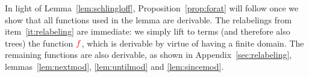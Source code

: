 In light of Lemma~\ref{lem:schlingloff},  Proposition~\ref{prop:forat} will follow once we  show that all functions  used in the lemma are derivable. The relabelings from item~\ref{it:relabeling} are immediate: we simply lift to terms (and therefore also trees) the function ${\color{red}{f}}$, which is derivable by virtue of having a finite domain. The remaining functions are also derivable, as shown in Appendix~\ref{sec:relabeling}, lemmas~\ref{lem:nextmod}, \ref {lem:untilmod} and \ref{lem:sincemod}. 